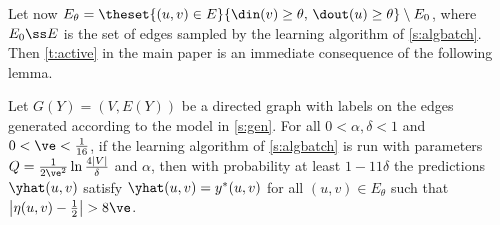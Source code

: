 Let now $E_{\theta} = \theset{(u,v) \in E}{\din(v) \ge \theta,\, \dout(u) \ge \theta} \setminus
E_0$, where $E_0 \ss E$ is the set of edges sampled by the learning algorithm of
\autoref{s:algbatch}. Then \autoref{t:active} in the main paper is an immediate consequence of the
following lemma. 

\begin{lemma}\label{l:active}
Let $G(Y) = (V,E(Y))$ be a directed graph with labels on the edges generated according to the model
in \autoref{s:gen}.
For all $0 < \alpha,\delta < 1$ and $0 < \ve < \tfrac{1}{16}$, if the learning algorithm of
\autoref{s:algbatch} is run with parameters $Q = \tfrac{1}{2\ve^2}\ln\frac{4|V|}{\delta}$ and
$\alpha$, then with probability at least $1-11\delta$ the predictions $\yhat(u,v)$ satisfy
$\yhat(u,v) = y^*(u,v)$ for all $(u,v) \in E_{\theta}$ such that $\big|\eta(u,v) - \tfrac{1}{2}\big|
> 8\ve$.
\end{lemma}

